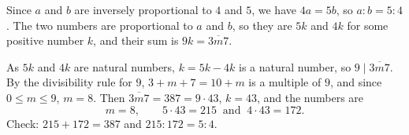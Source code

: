 Since $a$ and $b$ are inversely proportional to $4$ and $5$, we have $4a=5b$, so $a:b=5:4$. The two numbers are proportional to $a$ and $b$, so they are $5k$ and $4k$ for some positive number $k$, and their sum is $9k=\overline{3m7}$.

As $5k$ and $4k$ are natural numbers, $k=5k-4k$ is a natural number, so $9\mid\overline{3m7}$. By the divisibility rule for $9$, $3+m+7=10+m$ is a multiple of $9$, and since $0\le m\le9$, $m=8$. Then $\overline{3m7}=387=9\cdot43$, $k=43$, and the numbers are
\[
m=8,\qquad 5\cdot43=\boxed{215}\ \text{ and }\ 4\cdot43=\boxed{172}.
\]
Check: $215+172=387$ and $215:172=5:4$.
